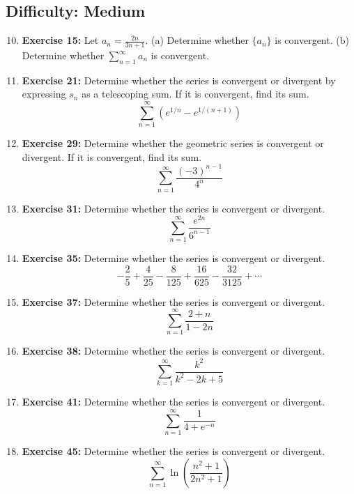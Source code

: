 \documentclass[12pt, a4paper]{article}
\begin{document}
\hrulefill
\vspace{1em}

\subsection*{Difficulty: Medium}
\begin{enumerate}
    \setcounter{enumi}{9}
    \item \textbf{Exercise 15:} Let $a_n = \frac{2n}{3n+1}$. (a) Determine whether $\{a_n\}$ is convergent. (b) Determine whether $\sum_{n=1}^{\infty} a_n$ is convergent.

    \item \textbf{Exercise 21:} Determine whether the series is convergent or divergent by expressing $s_n$ as a telescoping sum. If it is convergent, find its sum.
    \[ \sum_{n=1}^{\infty} (e^{1/n} - e^{1/(n+1)}) \]

    \item \textbf{Exercise 29:} Determine whether the geometric series is convergent or divergent. If it is convergent, find its sum.
    \[ \sum_{n=1}^{\infty} \frac{(-3)^{n-1}}{4^n} \]

    \item \textbf{Exercise 31:} Determine whether the series is convergent or divergent.
    \[ \sum_{n=1}^{\infty} \frac{e^{2n}}{6^{n-1}} \]
    
    \item \textbf{Exercise 35:} Determine whether the series is convergent or divergent.
    \[ -\frac{2}{5} + \frac{4}{25} - \frac{8}{125} + \frac{16}{625} - \frac{32}{3125} + \cdots \]

    \item \textbf{Exercise 37:} Determine whether the series is convergent or divergent.
    \[ \sum_{n=1}^{\infty} \frac{2+n}{1-2n} \]

    \item \textbf{Exercise 38:} Determine whether the series is convergent or divergent.
    \[ \sum_{k=1}^{\infty} \frac{k^2}{k^2 - 2k + 5} \]
    
    \item \textbf{Exercise 41:} Determine whether the series is convergent or divergent.
    \[ \sum_{n=1}^{\infty} \frac{1}{4 + e^{-n}} \]

    \item \textbf{Exercise 45:} Determine whether the series is convergent or divergent.
    \[ \sum_{n=1}^{\infty} \ln\left(\frac{n^2+1}{2n^2+1}\right) \]
    

\end{enumerate}
\end{document}
